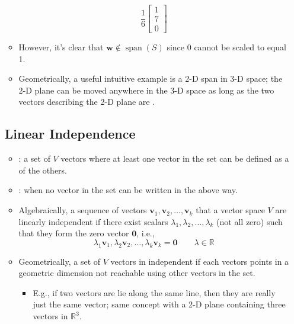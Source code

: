 \begin{itemize}
\begin{itemize}
\[    \frac{1}{6}\begin{bmatrix} 1 \\ 7 \\ 0 \end{bmatrix} 
    \]%
    \item However, it's clear that \(\bm{w}\notin \operatorname{span}(S) \) since 0 cannot be scaled to equal 1.
    \item Geometrically, a useful intuitive example is a 2-D span in 3-D space; the 2-D plane can be moved anywhere in the 3-D space as long as the two vectors describing the 2-D plane are \hyperref[Linear Independence]{}.
  \end{itemize}
  
  \subsection{Linear Independence}\label{Linear Independence}
  \begin{itemize}
    \item {}: a set of \(V\) vectors where at least one vector in the set can be defined as a \hyperref[Linear combination]{} of the others.
    \item {}: when no vector in the set can be written in the above way. 
    \item Algebraically, a sequence of vectors \(\bm{v}_1,\bm{v}_2,\dots,\bm{v}_k\) that a vector space \(V\) are linearly independent if there exist scalars \(\lambda_1,\lambda_2,\dots,\lambda_k\) (not all zero) such that they form the zero vector \(\bm{0}\), i.e.,
    \[%
    \lambda_1\bm{v}_1,\lambda_2\bm{v}_2,\dots,\lambda_k\bm{v}_k = \bm{0} \qquad \lambda \in \mathbb{R}
    \]%
    \item Geometrically, a set of \(V\) vectors in independent if each vectors points in a geometric dimension not reachable using other vectors in the set.
    \begin{itemize}
      \item E.g., if two vectors are lie along the same line, then they are really just the same vector; same concept with a 2-D plane containing three vectors in \(\mathbb{R}^3\).
    \end{itemize}
    \end{itemize}
  

\end{itemize}
